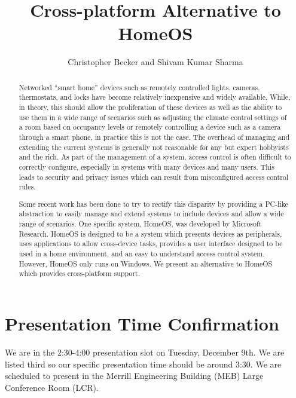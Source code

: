 \documentclass[letterpaper,12pt]{article}
\title{Cross-platform Alternative to HomeOS}
\author{Christopher Becker and Shivam Kumar Sharma}
\begin{document}
\maketitle

\begin{abstract}
Networked ``smart home'' devices such as remotely controlled lights, cameras,
thermostats, and locks have become relatively inexpensive and widely available.
While, in theory, this should allow the proliferation of these devices as well
as the ability to use them in a wide range of scenarios such as adjusting the
climate control settings of a room based on occupancy levels or remotely
controlling a device such as a camera through a smart phone, in practice this is
not the case. The overhead of managing and extending the current systems is
generally not reasonable for any but expert hobbyists and the rich. As part of
the management of a system, access control is often difficult to correctly
configure, especially in systems with many devices and many users. This leads to
security and privacy issues which can result from misconfigured access control
rules.

Some recent work has been done to try to rectify this disparity by providing a
PC-like abstraction to easily manage and extend systems to include devices and
allow a wide range of scenarios. One specific system, HomeOS, was developed by
Microsoft Research. HomeOS is designed to be a system which presents devices as
peripherals, uses applications to allow cross-device tasks, provides a user
interface designed to be used in a home environment, and an easy to understand
access control system. However, HomeOS only runs on Windows.  We present an
alternative to HomeOS which provides cross-platform support.
\end{abstract}


\section{Presentation Time Confirmation}
We are in the 2:30-4:00 presentation slot on Tuesday, December 9th.  We are
listed third so our specific presentation time should be around 3:30.  We are
scheduled to present in the Merrill Engineering Building (MEB) Large Conference
Room (LCR).

%
%
\end{document}
